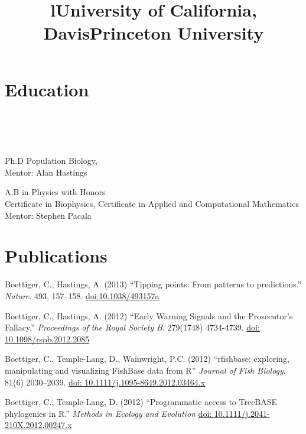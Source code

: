 \documentclass[margin]{res}
\begin{document}
\begin{resume}

\section{Education}
\begin{format}
\title{l}\\\\
\body\\
\end{format}

\title{\textbf{University of California, Davis}}
\begin{position}
Ph.D Population Biology, \\
Mentor: Alan Hastings
\end{position}

\title{\textbf{Princeton University}}
\begin{position}
A.B  in Physics with Honors \\ 
Certificate in Biophysics, Certificate in Applied and Computational Mathematics\\
Mentor: Stephen Pacala
\end{position}

\section{Publications}

Boettiger, C., Hastings, A. (2013) ``Tipping points: From patterns to predictions.'' {\it Nature}. 493, 157–158. \href{http://dx.doi.org/10.1038/493157a}{doi:10.1038/493157a}

Boettiger, C., Hastings, A. (2012) ``Early Warning Signals and the Prosecutor's Fallacy.'' {\it Proceedings of the Royal Society B}. 279(1748) 4734-4739.   \href{http://dx.doi.org/10.1098/rspb.2012.2085}{doi: 10.1098/rspb.2012.2085}

Boettiger, C., Temple-Lang, D., Wainwright, P.C. (2012) ``rfishbase: exploring, manipulating and visualizing FishBase data from R'' {\it Journal of Fish Biology}. 81(6) 2030–2039. \href{http://dx.doi.org/10.1111/j.1095-8649.2012.03464.x}{doi: 10.1111/j.1095-8649.2012.03464.x}

Boettiger, C., Temple-Lang, D. (2012)  ``Programmatic access to TreeBASE phylogenies in R.'' {\it Methods in Ecology and Evolution}  \href{http://dx.doi.org/10.1111/j.2041-210X.2012.00247.x}{doi: 10.1111/j.2041-210X.2012.00247.x}



\end{resume}
\end{document}
